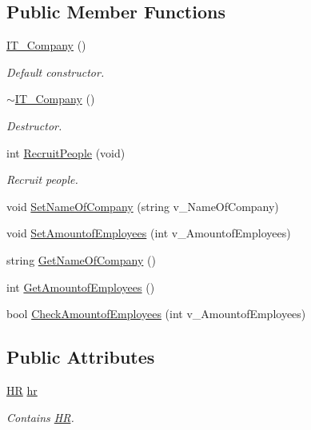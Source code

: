 \subsection*{Public Member Functions}
\begin{DoxyCompactItemize}
\item 
\hyperlink{class_i_t___company_a13bea9468214205bd5b4b57c6174de9a}{I\+T\+\_\+\+Company} ()
\begin{DoxyCompactList}\small\item\em Default constructor. \end{DoxyCompactList}\item 
\hyperlink{class_i_t___company_aacbb3e9ae0d6d8a41a25785484cfc05f}{$\sim$\+I\+T\+\_\+\+Company} ()
\begin{DoxyCompactList}\small\item\em Destructor. \end{DoxyCompactList}\item 
int \hyperlink{class_i_t___company_a2753c0f3da2fb8aee6a48b3ebe3bef79}{Recruit\+People} (void)
\begin{DoxyCompactList}\small\item\em Recruit people. \end{DoxyCompactList}\item 
void \hyperlink{class_i_t___company_a652c409e38a609c96e788be7687ab744}{Set\+Name\+Of\+Company} (string v\+\_\+\+Name\+Of\+Company)
\item 
void \hyperlink{class_i_t___company_a918bdfd512ef8267cf082a20e86a63e9}{Set\+Amountof\+Employees} (int v\+\_\+\+Amountof\+Employees)
\item 
string \hyperlink{class_i_t___company_addd5ab4a8699d8df60fd2cd00a4f9875}{Get\+Name\+Of\+Company} ()
\item 
int \hyperlink{class_i_t___company_ad5210ab4e6ef0a7c9b218678645410e4}{Get\+Amountof\+Employees} ()
\item 
bool \hyperlink{class_i_t___company_a8214142064b5b8f6fed854b45f83a2aa}{Check\+Amountof\+Employees} (int v\+\_\+\+Amountof\+Employees)
\end{DoxyCompactItemize}
\subsection*{Public Attributes}
\begin{DoxyCompactItemize}
\item 
\hyperlink{class_h_r}{HR} \hyperlink{class_i_t___company_a9ef1fdbdfe9220c9f91fee83bfe65c29}{hr}
\begin{DoxyCompactList}\small\item\em Contains \hyperlink{class_h_r}{HR}. \end{DoxyCompactList}\end{DoxyCompactItemize}
